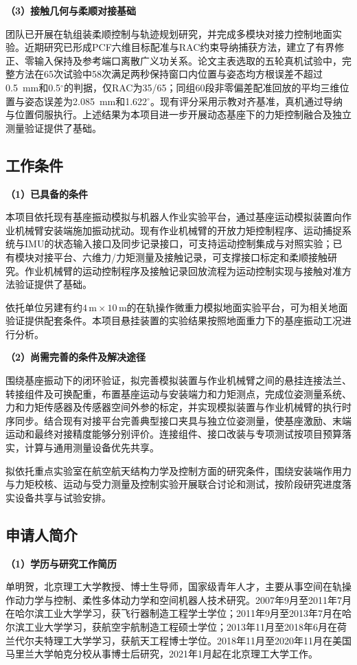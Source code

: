 \documentclass[UTF8,a4paper,zihao=-4,fontset=fandol]{ctexart}
\newcommand{\topic}[1]{\par\Needspace{4\baselineskip}\addvspace{0.5em}\noindent\textbf{#1}\par\nobreak}
\begin{document}
\topic{（3）接触几何与柔顺对接基础}

团队已开展在轨组装柔顺控制与轨迹规划研究，并完成多模块对接力控制地面实验\cite{shi2024}。近期研究已形成PCF六维目标配准与RAC约束导纳捕获方法，建立了有界修正、零输入保持及参考端口离散广义功关系。论文主表选取的五轮真机试验中，完整方法在65次试验中58次满足两秒保持窗口内位置与姿态均方根误差不超过0.5~mm和0.5$^\circ$的判据，仅RAC为35/65；同组60段非零偏差配准回放的平均三维位置与姿态误差为2.085~mm和1.622$^\circ$。现有评分采用示教对齐基准，真机通过导纳与位置伺服执行。上述结果为本项目进一步开展动态基座下的力矩控制融合及独立测量验证提供了基础。

\subsection{工作条件}

\topic{（1）已具备的条件}

本项目依托现有基座振动模拟与机器人作业实验平台，通过基座运动模拟装置向作业机械臂安装端施加振动扰动。现有作业机械臂的开放力矩控制程序、运动捕捉系统与IMU的状态输入接口及同步记录接口，可支持运动控制集成与对照实验；已有模块对接平台、六维力/力矩测量及接触记录，可支撑接口标定和柔顺接触研究。作业机械臂的运动控制程序及接触记录回放流程为运动控制实现与接触对准方法验证提供了基础。

依托单位另建有约$4\,\mathrm m\times10\,\mathrm m$的在轨操作微重力模拟地面实验平台，可为相关地面验证提供配套条件。本项目悬挂装置的实验结果按照地面重力下的基座振动工况进行分析。

\topic{（2）尚需完善的条件及解决途径}

围绕基座振动下的闭环验证，拟完善模拟装置与作业机械臂之间的悬挂连接法兰、转接组件及可换配重，布置基座运动与安装端力和力矩测点，完成位姿测量系统、力和力矩传感器及传感器空间外参的标定，并实现模拟装置与作业机械臂的执行时序同步。结合现有对接平台完善典型接口夹具与独立位姿测量，使基座激励、末端运动和最终对接精度能够分别评价。连接组件、接口改装与专项测试按项目预算落实，计算与通用测量设备优先共享。

拟依托重点实验室在航空航天结构力学及控制方面的研究条件，围绕安装端作用力与力矩校核、运动与受力测量及控制实验开展联合讨论和测试，按阶段研究进度落实设备共享与试验安排。


\subsection{申请人简介}

\topic{（1）学历与研究工作简历}

单明贺，北京理工大学教授、博士生导师，国家级青年人才，主要从事空间在轨操作动力学与控制、柔性多体动力学和空间机器人技术研究。2007年9月至2011年7月在哈尔滨工业大学学习，获飞行器制造工程学士学位；2011年9月至2013年7月在哈尔滨工业大学学习，获航空宇航制造工程硕士学位；2013年11月至2018年6月在荷兰代尔夫特理工大学学习，获航天工程博士学位。2018年11月至2020年11月在美国马里兰大学帕克分校从事博士后研究，2021年1月起在北京理工大学工作。
\end{document}
